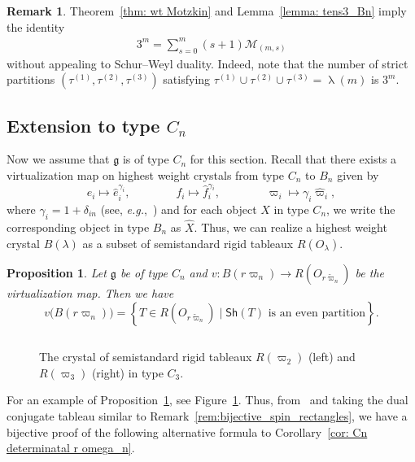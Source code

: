 \documentclass[11pt, leqno]{amsart}
\theoremstyle{plain}
\newtheorem{proposition}[theorem]{Proposition}
\theoremstyle{definition}
\newtheorem{remark}[theorem]{Remark}
\numberwithin{equation}{section}
\newcommand{\g}{\mathfrak{g}}
\newcommand{\fw}{\varpi} %
\newcommand{\tfw}{\widetilde{\fw}} %
\newcommand{\Mot}{\mathcal{M}} %
\newcommand{\virtual}[1]{\widehat{#1}}  %
\newcommand{\Sh}{\mathsf{Sh}}
\begin{document}
\begin{remark}
Theorem~\ref{thm: wt Motzkin} and Lemma~\ref{lemma: tens3_Bn} imply the identity
\begin{align}\label{eq: Motzkin}
 3^m =\sum_{s=0}^m (s+1) \Mot_{(m,s)}
\end{align}
without appealing to Schur--Weyl duality.
Indeed, note that the number of strict partitions $(\tau^{(1)},\tau^{(2)},\tau^{(3)})$ satisfying $\tau^{(1)} \cup \tau^{(2)} \cup \tau^{(3)}=\uplambda(m)$ is $3^m$.
\end{remark}


\subsection{Extension to type $C_n$}

Now we assume that $\g$ is of type $C_n$ for this section.
Recall that there exists a virtualization map on highest weight crystals from type $C_n$ to $B_n$ given by
\[
e_i \mapsto \virtual{e}_i^{\gamma_i},
\qquad\qquad
f_i \mapsto \virtual{f}_i^{\gamma_i},
\qquad\qquad
\fw_i \mapsto \gamma_i \virtual{\fw}_i,
\]
where $\gamma_i = 1+\delta_{in}$ (see, \textit{e.g.},~\cite{K96,OSS03III,OSS03II,SchillingS15}) and for each object $X$ in type $C_n$, we write the corresponding object in type $B_n$ as $\virtual{X}$. Thus, we can realize a highest weight crystal $B(\lambda)$ as a subset of semistandard rigid tableaux $R(O_{\lambda})$.

\begin{proposition}
\label{prop:virtual_rigid}
Let $\g$ be of type $C_n$ and $v \colon B(r\fw_n) \to R(O_{r\tfw_n})$ be the virtualization map. Then we have
\[
v\bigl( B(r\fw_n) \bigr) = \left\{ T \in R\left(O_{r\tfw_n} \right) \mid \text{$\Sh(T)$ is an even partition} \right\}.
\]
\end{proposition}

\begin{figure}
\[

\]
\caption{The crystal of semistandard rigid tableaux $R(\fw_2)$ (left) and $R(\fw_3)$ (right) in type $C_3$.}
\label{fig:rigid_virtual}
\clearpage
\end{figure}

For an example of Proposition~\ref{prop:virtual_rigid}, see Figure~\ref{fig:rigid_virtual}.
Thus, from~\cite[Eq.~(2)]{dSCV86} and taking the dual conjugate tableau similar to Remark~\ref{rem:bijective_spin_rectangles}, we have a bijective proof of the following alternative formula to Corollary~\ref{cor: Cn determinatal r omega_n}.
\end{document}
